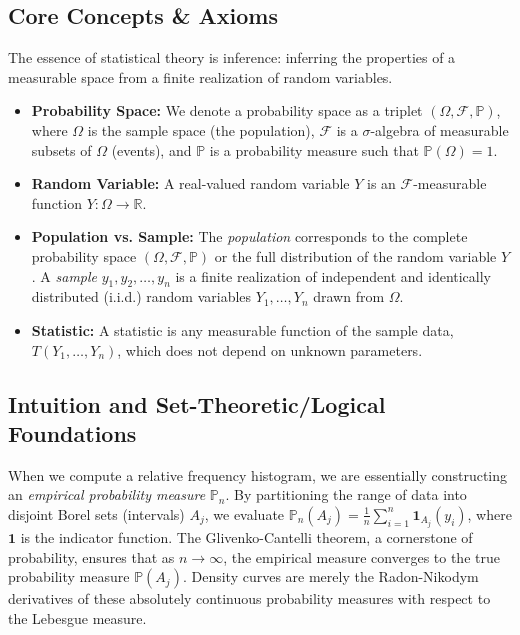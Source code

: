 \documentclass[11pt]{article}
\theoremstyle{definition}
\theoremstyle{remark}
\newcommand{\R}{\mathbb{R}}
\newcommand{\Prob}{\mathbb{P}}
\newcommand{\F}{\mathcal{F}}
\begin{document}
\subsection{Core Concepts \& Axioms}
The essence of statistical theory is inference: inferring the properties of a measurable space from a finite realization of random variables. 
\begin{itemize}
    \item \textbf{Probability Space:} We denote a probability space as a triplet $(\Omega, \F, \Prob)$, where $\Omega$ is the sample space (the population), $\F$ is a $\sigma$-algebra of measurable subsets of $\Omega$ (events), and $\Prob$ is a probability measure such that $\Prob(\Omega) = 1$.
    \item \textbf{Random Variable:} A real-valued random variable $Y$ is an $\F$-measurable function $Y: \Omega \to \R$. 
    \item \textbf{Population vs. Sample:} The \textit{population} corresponds to the complete probability space $(\Omega, \F, \Prob)$ or the full distribution of the random variable $Y$. A \textit{sample} $y_1, y_2, \dots, y_n$ is a finite realization of independent and identically distributed (i.i.d.) random variables $Y_1, \dots, Y_n$ drawn from $\Omega$.
    \item \textbf{Statistic:} A statistic is any measurable function of the sample data, $T(Y_1, \dots, Y_n)$, which does not depend on unknown parameters.
\end{itemize}

\subsection{Intuition and Set-Theoretic/Logical Foundations}
When we compute a relative frequency histogram, we are essentially constructing an \textit{empirical probability measure} $\Prob_n$. By partitioning the range of data into disjoint Borel sets (intervals) $A_j$, we evaluate $\Prob_n(A_j) = \frac{1}{n} \sum_{i=1}^n \mathbf{1}_{A_j}(y_i)$, where $\mathbf{1}$ is the indicator function. The Glivenko-Cantelli theorem, a cornerstone of probability, ensures that as $n \to \infty$, the empirical measure converges to the true probability measure $\Prob(A_j)$. Density curves are merely the Radon-Nikodym derivatives of these absolutely continuous probability measures with respect to the Lebesgue measure.
\end{document}

